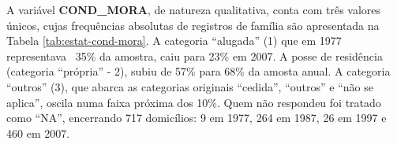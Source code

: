\begin{table}[htb]
\centering

\end{table}


\newpage 

A variável \textbf{COND_MORA}, de natureza qualitativa, conta com três valores únicos, cujas frequências absolutas de registros de família são apresentada na Tabela \ref{tab:estat-cond-mora}. 
A categoria ``alugada'' (1) que em 1977 representava ~35\% da amostra, caiu para 23\% em 2007. A posse de residência (categoria ``própria'' - 2), subiu de 57\% para 68\% da amosta anual. A categoria ``outros'' (3), que abarca as categorias originais ``cedida'', ``outros'' e ``não se aplica'', oscila numa faixa próxima dos 10\%. Quem não respondeu foi tratado como ``NA'', encerrando 717 domicílios: 9 em 1977, 264 em 1987, 26 em 1997 e 460 em 2007.

